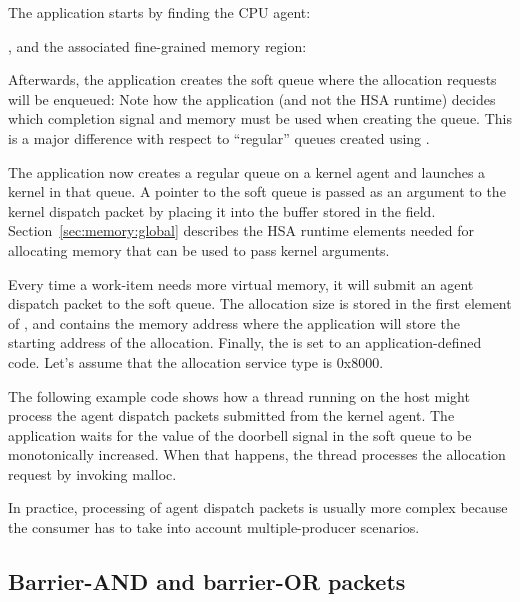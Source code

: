 \documentclass[final,oneside]{book}
\begin{document}
The application starts by finding the CPU agent:

, and the associated fine-grained memory region:

Afterwards, the application creates the soft queue where the allocation requests
will be enqueued:  Note how
the application (and not the HSA runtime) decides which completion signal and
memory must be used when creating the queue. This is a major difference with
respect to ``regular'' queues created using .

The application now creates a regular queue on a kernel agent and launches a
kernel in that queue. A pointer to the soft queue is passed as an argument to
the kernel dispatch packet by placing it into the buffer stored in the
field. Section~\ref{sec:memory:global} describes the HSA runtime elements needed
for allocating memory that can be used to pass kernel arguments.

Every time a work-item needs more virtual memory, it will submit an agent
dispatch packet to the soft queue. The allocation size is stored in the first
element of , and
 contains the memory address
where the application will store the starting address of the allocation.
Finally, the  is set to an
application-defined code. Let's assume that the allocation service type is
0x8000.

The following example code shows how a thread running on the host might process
the agent dispatch packets submitted from the kernel agent. The application
waits for the value of the doorbell signal in the soft queue to be monotonically
increased. When that happens, the thread processes the allocation request by
invoking malloc.


In practice, processing of agent dispatch packets is usually more complex
because the consumer has to take into account multiple-producer scenarios.

\subsection{Barrier-AND and barrier-OR packets}\label{barrier-packet}
\end{document}
